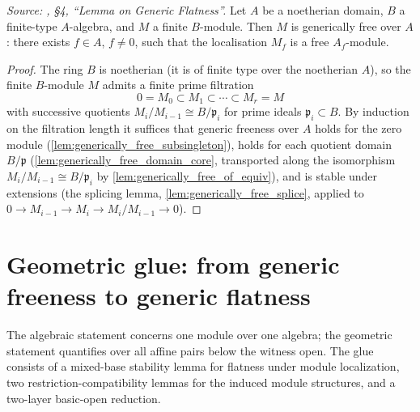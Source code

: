 \begin{theorem}\leanok
  \label{thm:generic_flatness_algebraic}
  \textit{Source: \cite{nitsure-hilbert-quot}, \S4, ``Lemma on Generic Flatness''.}
  Let \(A\) be a noetherian domain, \(B\) a finite-type \(A\)-algebra, and \(M\) a finite
  \(B\)-module. Then \(M\) is generically free over \(A\): there exists
  \(f \in A\), \(f \ne 0\), such that the localisation
  \(M_f\) is a free \(A_f\)-module.
\end{theorem}

\begin{proof}
\leanok
  The ring \(B\) is noetherian (it is of finite type over the noetherian
  \(A\)), so the finite \(B\)-module \(M\) admits a finite prime filtration
  \[
    0 = M_0 \subset M_1 \subset \cdots \subset M_r = M
  \]
  with successive quotients \(M_i / M_{i-1} \cong B / \mathfrak{p}_i\) for
  prime ideals \(\mathfrak{p}_i \subset B\).  By induction on the filtration
  length it suffices that generic freeness over \(A\) holds for the zero
  module (\cref{lem:generically_free_subsingleton}), holds for each quotient
  domain \(B/\mathfrak{p}\) (\cref{lem:generically_free_domain_core},
  transported along the isomorphism \(M_i/M_{i-1} \cong B/\mathfrak{p}_i\) by
  \cref{lem:generically_free_of_equiv}), and is stable under extensions
  (the splicing lemma, \cref{lem:generically_free_splice}, applied to
  \(0 \to M_{i-1} \to M_i \to M_i/M_{i-1} \to 0\)).
\end{proof}

\section{Geometric glue: from generic freeness to generic flatness}

The algebraic statement concerns one module over one algebra; the geometric
statement quantifies over all affine pairs below the witness open. The glue
consists of a mixed-base stability lemma for flatness under module
localization, two restriction-compatibility lemmas for the induced module
structures, and a two-layer basic-open reduction.

